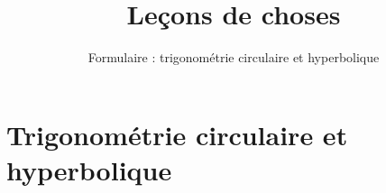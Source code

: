 







\title{{\bf Leçons de choses}}
\subtitle{Formulaire : trigonométrie circulaire et hyperbolique}

\begin{frame}
  
  \debutmontitre

% 

\end{frame}

\setcounter{framenumber}{0}





\section{Trigonométrie circulaire et hyperbolique}



